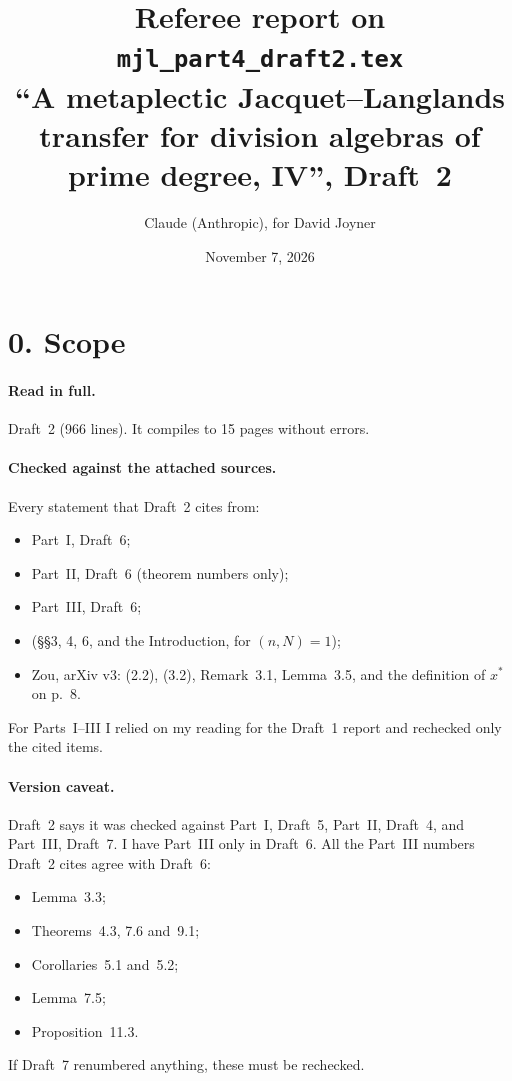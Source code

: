 \documentclass[11pt]{article}
\title{Referee report on \texttt{mjl\_part4\_draft2.tex}\\
\normalsize ``A metaplectic Jacquet--Langlands transfer for division
algebras of prime degree, IV'', Draft~2}
\author{Claude (Anthropic), for David Joyner}
\date{November 7, 2026}
\begin{document}
\maketitle

\section*{0. Scope}
\paragraph{Read in full.} Draft~2 (966 lines). It compiles to 15 pages
without errors.

\paragraph{Checked against the attached sources.} Every statement that
Draft~2 cites from:
\begin{itemize}
\item Part~I, Draft~6;
\item Part~II, Draft~6 (theorem numbers only);
\item Part~III, Draft~6;
\item [FK] (\S\S3, 4, 6, and the Introduction, for $(n,N)=1$);
\item Zou, arXiv v3: (2.2), (3.2), Remark~3.1, Lemma~3.5, and the
definition of $x^*$ on p.~8.
\end{itemize}
For Parts~I--III I relied on my reading for the Draft~1 report and
rechecked only the cited items.

\paragraph{Version caveat.} Draft~2 says it was checked against Part~I,
Draft~5, Part~II, Draft~4, and Part~III, Draft~7. I have Part~III only
in Draft~6. All the Part~III numbers Draft~2 cites agree with Draft~6:
\begin{itemize}
\item Lemma~3.3;
\item Theorems~4.3, 7.6 and~9.1;
\item Corollaries~5.1 and~5.2;
\item Lemma~7.5;
\item Proposition~11.3.
\end{itemize}
If Draft~7 renumbered anything, these must be rechecked.
\end{document}
